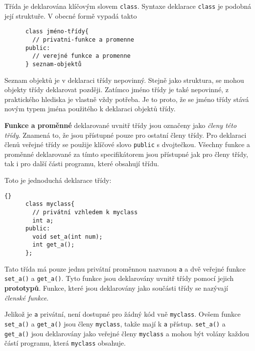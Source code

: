 {      Třída je deklarována klíčovým slovem \lstinline[basicstyle=\ttfamily]!class!. Syntaxe 
      deklarace \lstinline[basicstyle=\ttfamily]!class! je podobná její struktuře. V obecné formě 
      vypadá takto
  
      \lstset{numbers=none}
      \begin{lstlisting}
      class jméno-třídy{
        // privatni-funkce a promenne
      public:
        // verejné funkce a promenne
      } seznam-objektů
      \end{lstlisting}
      Seznam objektů je v deklaraci třídy nepovinný. Stejně jako struktura, se  mohou  objekty 
      třídy deklarovat později. Zatímco jméno třídy je také nepovinné, z praktického hlediska je 
      vlastně vždy potřeba. Je to proto, že se jméno třídy stává novým typem jména použitého k 
      deklaraci objektů třídy.
  
      \textbf{Funkce a proměnné} deklarované uvnitř třídy jsou označeny jako \textit{členy této 
      třídy}. Znamená to, že jsou přístupné pouze pro ostatní členy třídy. Pro deklaraci členů 
      veřejné třídy se použije klíčové slovo \lstinline[basicstyle=\ttfamily]!public! s dvojtečkou. 
      Všechny funkce a proměn\-né deklarované za tímto specifikátorem jsou přístupné jak pro členy 
      třídy, tak i pro další části programu, které obsahují třídu.
  
      Toto je jednoduchá deklarace třídy:
  
      \begin{lstlisting}{}
      class myclass{
        // privátní vzhledem k myclass
        int a;
      public:
        void set_a(int num);
        int get_a();
      };
      \end{lstlisting}
      Tato třída má pouze jednu privátní proměnnou nazvanou \lstinline[basicstyle=\ttfamily]!a! a 
      dvě veřejné funkce \lstinline[basicstyle=\ttfamily]!set_a()! a 
      \lstinline[basicstyle=\ttfamily]!get_a()!. Tyto funkce jsou deklarovány uvnitř třídy pomocí 
      jejich \textbf{prototypů}. Funkce, které jsou deklarovány jako součásti třídy se nazývají 
      \textit{členské funkce}.
  
      Jelikož je \lstinline[basicstyle=\ttfamily]!a! privátní, není dostupné pro žádný kód vně
      \lstinline[basicstyle=\ttfamily]!myclass!. Ovšem funkce 
      \lstinline[basicstyle=\ttfamily]!set_a()! a
      \lstinline[basicstyle=\ttfamily]!get_a()! jsou členy 
      \lstinline[basicstyle=\ttfamily]!myclass!, takže 
      mají k \lstinline[basicstyle=\ttfamily]!a! přístup. \lstinline[basicstyle=\ttfamily]!set_a()! 
      a
      \lstinline[basicstyle=\ttfamily]!get_a()! jsou deklarovány jako veřejné členy 
      \lstinline[basicstyle=\ttfamily]!myclass! a mohou být volány každou částí programu, která 
      \lstinline[basicstyle=\ttfamily]!myclass! obsahuje.
  
}
